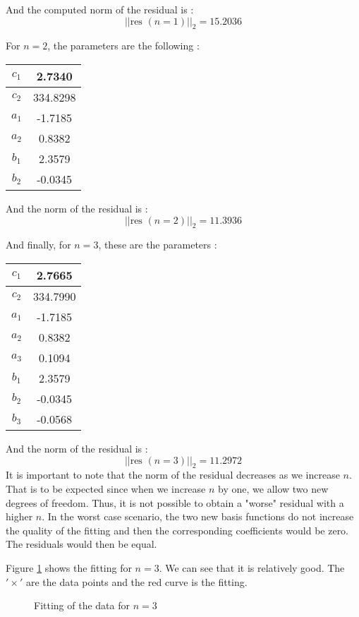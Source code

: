 And the computed norm of the residual is :
$$||\text{res }(n=1)||_2=15.2036$$

For $n=2$, the parameters are the following : 

\begin{center}
\begin{tabular}{|c|c|}
\hline 
$c_1$ & 2.7340 \\ 
\hline 
$c_2$ & 334.8298 \\ 
\hline 
$a_1$ & -1.7185 \\ 
\hline 
$a_2$ & 0.8382 \\
\hline
$b_1$ & 2.3579 \\ 
\hline 
$b_2$ & -0.0345\\
\hline
\end{tabular} 
\end{center}

And the norm of the residual is :
$$||\text{res }(n=2)||_2=11.3936$$

And finally, for $n=3$, these are the parameters : 

\begin{center}
\begin{tabular}{|c|c|}
\hline 
$c_1$ & 2.7665 \\ 
\hline 
$c_2$ & 334.7990 \\ 
\hline 
$a_1$ & -1.7185 \\ 
\hline 
$a_2$ & 0.8382 \\
\hline
$a_3$ & 0.1094\\
\hline
$b_1$ & 2.3579 \\ 
\hline 
$b_2$ & -0.0345\\
\hline
$b_3$ & -0.0568\\
\hline
\end{tabular} 
\end{center}

And the norm of the residual is :
$$||\text{res }(n=3)||_2=11.2972$$
It is important to note that the norm of the residual decreases as we increase $n$. That is to be expected since when we increase $n$ by one, we allow two new degrees of freedom. Thus, it is not possible to obtain a "worse" residual with a higher $n$. In the worst case scenario, the two new basis functions do not increase the quality of the fitting and then the corresponding coefficients would be zero. The residuals would then be equal.

Figure \ref{lsp} shows the fitting for $n=3$. We can see that it is relatively good. The $'\times'$ are the data points and the red curve is the fitting.

\begin{figure}
\begin{center}
\caption{Fitting of the data for $n=3$}
\label{lsp}
\end{center}
\end{figure}
